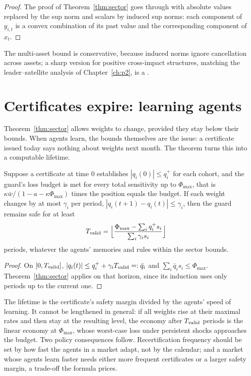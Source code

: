 \begin{proof}
The proof of Theorem~\ref{thm:sector} goes through with absolute values replaced by the sup norm and scalars by induced sup norms: each component of $y_{i,t}$ is a convex combination of its past value and the corresponding component of $x_t$.
\end{proof}

The multi-asset bound is conservative, because induced norms ignore cancellation across assets; a sharp version for positive cross-impact structures, matching the leader--satellite analysis of Chapter~\ref{ch:p2}, is a \Target{}.

\section{Certificates expire: learning agents}\label{sec:bl_learning}

Theorem~\ref{thm:sector} allows weights to change, provided they stay below their bounds. When agents learn, the bounds themselves are the issue: a certificate issued today says nothing about weights next month. The theorem turns this into a computable lifetime.

\begin{corollary}\label{thm:lifetime}
Suppose a certificate at time $0$ establishes $|q_i(0)|\le q_i^+$ for each cohort, and the guard's loss budget is met for every total sensitivity up to $\Phi_{\max}$, that is $\kappa\bar w/(1-a-\kappa\Phi_{\max})$ times the position equals the budget. If each weight changes by at most $\gamma_i$ per period, $|q_i(t+1)-q_i(t)|\le\gamma_i$, then the guard remains safe for at least
\[
T_{\rm valid}=\Bigl\lfloor\frac{\Phi_{\max}-\sum_iq_i^+s_i}{\sum_i\gamma_is_i}\Bigr\rfloor
\]
periods, whatever the agents' memories and rules within the sector bounds. \hfill\Proved
\end{corollary}

\begin{proof}
On $[0,T_{\rm valid}]$, $|q_i(t)|\le q_i^++\gamma_iT_{\rm valid}=:\bar q_i$ and $\sum_i\bar q_is_i\le\Phi_{\max}$. Theorem~\ref{thm:sector} applies on that horizon, since its induction uses only periods up to the current one.
\end{proof}

The lifetime is the certificate's safety margin divided by the agents' speed of learning. It cannot be lengthened in general: if all weights rise at their maximal rates and then stay at the resulting level, the economy after $T_{\rm valid}$ periods is the linear economy at $\Phi_{\max}$, whose worst-case loss under persistent shocks approaches the budget. Two policy consequences follow. Recertification frequency should be set by how fast the agents in a market adapt, not by the calendar; and a market whose agents learn faster needs either more frequent certificates or a larger safety margin, a trade-off the formula prices.

